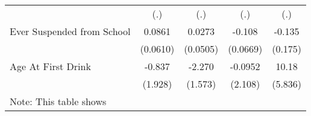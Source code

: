 {\begin{tabular}{l*{4}{c}}
            &         (.)         &         (.)         &         (.)         &         (.)         \\
[1em]
Ever Suspended from School&      0.0861         &      0.0273         &      -0.108         &      -0.135         \\
            &    (0.0610)         &    (0.0505)         &    (0.0669)         &     (0.175)         \\
[1em]
Age At First Drink&      -0.837         &      -2.270         &     -0.0952         &       10.18         \\
            &     (1.928)         &     (1.573)         &     (2.108)         &     (5.836)         \\
\hline\hline
\multicolumn{5}{l}{\footnotesize Note: This table shows}\\
\end{tabular}
}
